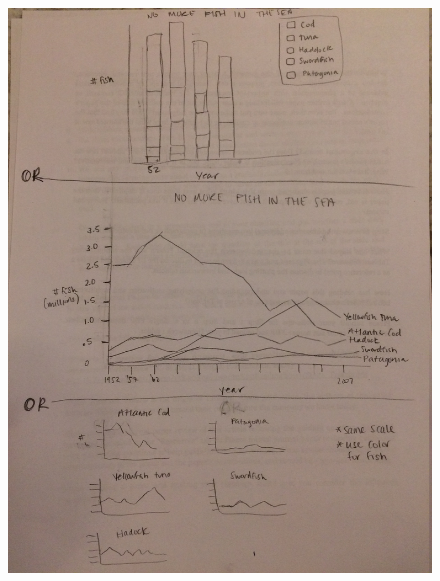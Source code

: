 \documentclass{neu_handout}
\begin{document}
\begin{figure}[h]
\centering
{
\includegraphics[width=0.4\linewidth]{part2_2}
}
\end{figure}
\end{document}

